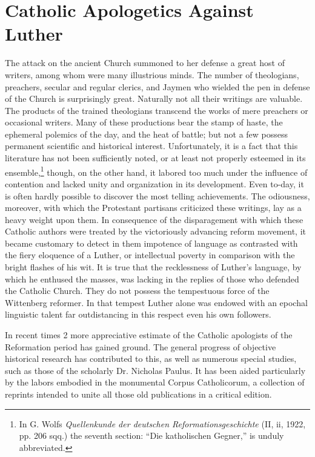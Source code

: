 \section{Catholic Apologetics Against Luther}

The attack on the ancient Church summoned to her defense a
great host of writers, among whom were many illustrious minds.
The number of theologians, preachers, secular and regular clerics, and
Jaymen who wielded the pen in defense of the Church is surprisingly
great. Naturally not all their writings are valuable. The products
of the trained theologians transcend the works of mere preachers
or occasional writers. Many of these productions bear the stamp of
haste, the ephemeral polemics of the day, and the heat of battle; but
not a few possess permanent scientific and historical interest.
Unfortunately, it is a fact that this literature has not been sufficiently
noted, or at least not properly esteemed in its ensemble,\footnote
{In G. Wolfs \textit{Quellenkunde der deutschen Reformationsgeschichte} (II, ii, 1922, pp. 206
sqq.) the seventh section: “Die katholischen Gegner,” is unduly abbreviated.}
though, on the other hand, it labored too much under the influence
of contention and lacked unity and organization in its development.
Even to-day, it is often hardly possible to discover the most telling
achievements. The odiousness, moreover, with which the Protestant
partisans criticized these writings, lay as a heavy weight upon them.
In consequence of the disparagement with which these Catholic
authors were treated by the victoriously advancing reform movement,
it became customary to detect in them impotence of language
as contrasted with the fiery eloquence of a Luther, or intellectual
poverty in comparison with the bright flashes of his wit. It is true that
the recklessness of Luther’s language, by which he enthused the masses,
was lacking in the replies of those who defended the Catholic Church.
They do not possess the tempestuous force of the Wittenberg reformer.
In that tempest Luther alone was endowed with an epochal
linguistic talent far outdistancing in this respect even his own
followers.

In recent times 2 more appreciative estimate of the Catholic apologists
of the Reformation period has gained ground. The general
progress of objective historical research has contributed to this, as
well as numerous special studies, such as those of the scholarly Dr.
Nicholas Paulus. It has been aided particularly by the labors embodied
in the monumental Corpus Catholicorum, a collection of reprints
intended to unite all those old publications in a critical edition.

